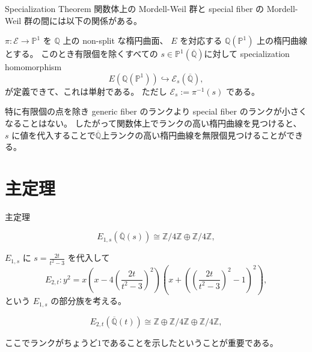 \documentclass{classes/mybeamer}
\begin{document}
\begin{frame}{Specialization Theorem}
    関数体上の Mordell-Weil 群と special fiber の Mordell-Weil 群の間には以下の関係がある。
    \begin{thm}
        \label{thm:specialization}
        $\pi:\mathcal{E} \to \mathbb{P}^1$ を $\mathbb{Q}$ 上の non-split な楕円曲面、 $E$ を対応する $\mathbb{Q}(\mathbb{P}^1)$ 上の楕円曲線とする。
        このとき有限個を除くすべての $s \in \mathbb{P}^1(\overline{\mathbb{Q}})$に対して specialization homomorphism
        \begin{equation*}
            E(\mathbb{Q}(\mathbb{P}^1)) \hookrightarrow \mathcal{E}_{s}(\overline{\mathbb{Q}}),
        \end{equation*}
        が定義できて、これは単射である。
        ただし $\mathcal{E}_s:=\pi^{-1}(s)$ である。
    \end{thm}
    特に有限個の点を除き generic fiber のランクより special fiber のランクが小さくなることはない。
    したがって関数体上でランクの高い楕円曲線を見つけると、 $s$ に値を代入することで$\overline{\mathbb{Q}}$上ランクの高い楕円曲線を無限個見つけることができる。
\end{frame}

\section{主定理}
\begin{frame}{主定理}
    \begin{proposition}
        \begin{equation*}
            E_{1,s}(\overline{\mathbb{Q}}(s)) \cong \mathbb{Z} / 4 \mathbb{Z} \oplus \mathbb{Z} / 4 \mathbb{Z},
        \end{equation*}
    \end{proposition}
    \vspace{1em}

    $E_{1,s}$ に $s = \frac{2t}{t^{2} - 3}$ を代入して
    \begin{equation*}
        E_{2,t}: y^{2} = x \left(x - 4 \left(\frac{2t}{t^{2} - 3} \right)^{2} \right) \left(x + \left(\left(\frac{2t}{t^{2} - 3} \right)^{2} - 1 \right)^{2} \right),
    \end{equation*}
    という $E_{1,s}$ の部分族を考える。
    \begin{thm}[主定理]
        \begin{equation*}
            E_{2,t}(\overline{\mathbb{Q}}(t)) \cong \mathbb{Z} \oplus \mathbb{Z} / 4 \mathbb{Z} \oplus \mathbb{Z} / 4 \mathbb{Z},
        \end{equation*}
    \end{thm}
    ここでランクがちょうど$1$であることを示したということが重要である。
\end{frame}
\end{document}
